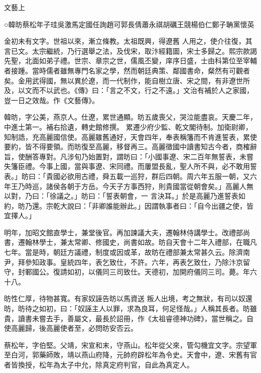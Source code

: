 
\begin{pinyinscope}

 文藝上



 ○韓昉蔡松年子珪吳激馬定國任詢趙可郭長倩蕭永祺胡礪王競楊伯仁鄭子聃黨懷英



 金初未有文字。世祖以來，漸立條教。太祖既興，得遼舊
 人用之，使介往復，其言已文。太宗繼統，乃行選舉之法，及伐宋，取汴經籍圖，宋士多歸之。熙宗款謁先聖，北面如弟子禮。世宗、章宗之世，儒風丕變，庠序日盛，士由科第位至宰輔者接踵。當時儒者雖無專門名家之學，然而朝廷典策、鄰國書命，粲然有可觀者矣。金用武得國，無以異於遼，而一代制作，能自樹立唐、宋之間，有非遼世所及，以文而不以武也。《傳》曰：「言之不文，行之不遠。」文治有補於人之家國，豈一日之效哉。作《文藝傳》。



 韓昉，字公美，燕京人。仕遼，累世通顯。昉五歲喪父，哭泣能盡哀。天慶二年，中進士第一。補右拾遺，轉史館修撰。
 累遷少府少監、乾文閣待制。加衛尉卿，知制誥，充高麗國信使。高麗雖舊通好，天會四年，奉表稱籓而不肯進誓表，累使要約，皆不得要領。而昉復至高麗，移督再三。高麗徵國中讀書知古今者，商榷辭旨，使酬答專對。凡涉旬乃始置對，謂昉曰：「小國事遼、宋二百年無誓表，未嘗失籓臣禮。今事上國，當與事遼、宋同禮。而屢盟長亂，聖人所不與，必不敢用誓表。」昉曰：「貴國必欲用古禮，舜五載一巡狩，群后四朝。周六年五服一朝，又六年王乃時巡，諸侯各朝于方岳。今天子方事西狩，則貴國當從朝會矣。」高麗人無以對，乃曰：「徐議之。」昉曰：「誓表朝會，一
 言決耳。」於是高麗乃進誓表如約，昉乃還。宗乾大說曰：「非卿誰能辦此。」因謂執事者曰：「自今出疆之使，皆宜擇人。」



 明年，加昭文館直學士，兼堂後官。再加諫議大夫，遷翰林侍講學士。改禮部尚書，遷翰林學士，兼太常卿、修國史，尚書如故。昉自天會十二年入禮部，在職凡七年。當是時，朝廷方議禮，制度或因或革，故昉在禮部兼太常甚久云。除濟南尹，拜參知政事。皇統四年，表乞致仕，不許。六年，再表乞致仕，乃除汴京留守，封鄆國公。復請如初，以儀同三司致仕。天德初，加開府儀同三司。薨。年六十八。



 昉性仁厚，待物甚寬。有家奴誣告昉以馬資送
 叛人出境，考之無狀，有司以奴還昉，昉待之如初，曰：「奴誣主人以罪，求為良耳，何足怪哉。」人稱其長者。昉雖貴，讀書未嘗去手，善屬文，最長於詔冊，作《太祖睿德神功碑》，當世稱之。自使高麗歸，後高麗使者至，必問昉安否云。



 蔡松年，字伯堅。父靖，宋宣和末，守燕山。松年從父來，管勾機宜文字。宗望軍至白河，郭藥師敗，靖以燕山府降，元帥府辟松年為令史。天會中，遼、宋舊有官者皆換授，松年為太子中允，除真定府判官，自此為真定人。




\end{pinyinscope}
